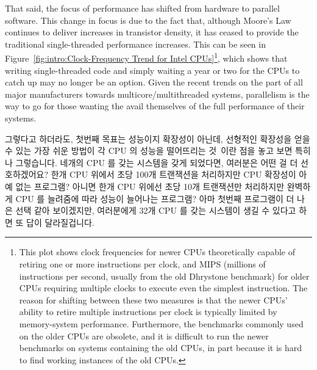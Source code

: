That said, the focus of performance has shifted from hardware to
parallel software.
This change in focus is due to the fact that, although Moore's Law
continues to deliver increases in transistor density, it has ceased to
provide the traditional single-threaded performance increases.
This can be seen in
Figure~\ref{fig:intro:Clock-Frequency Trend for Intel CPUs}\footnote{
	This plot shows clock frequencies for newer CPUs theoretically
	capable of retiring one or more instructions per clock, and MIPS
	(millions of instructions per second, usually from the old
	Dhrystone benchmark)
	for older CPUs requiring multiple clocks to execute even the
	simplest instruction.
	The reason for shifting between these two measures is that the
	newer CPUs' ability to retire multiple instructions per clock is
	typically limited by memory-system performance.
	Furthermore, the benchmarks commonly used on the older CPUs
	are obsolete, and it is difficult to run the newer benchmarks
	on systems containing the old CPUs, in part because it is hard
	to find working instances of the old CPUs.},
which shows that writing single-threaded code and simply waiting
a year or two for the CPUs to catch up may no longer be an option.
Given the recent trends on the part of all major manufacturers towards
multicore/multithreaded systems, parallelism is the way to go for
those wanting the avail themselves of the full performance of their
systems.
\fi

그렇다고 하더라도, 첫번째 목표는 성능이지 확장성이 아닌데, 선형적인 확장성을
얻을 수 있는 가장 쉬운 방법이 각 CPU 의 성능을 떨어뜨리는
것~\cite{LinusTorvalds2001a}이란 점을 놓고 보면 특히나 그렇습니다.
네개의 CPU 를 갖는 시스템을 갖게 되었다면, 여러분은 어떤 걸 더 선호하겠어요?
한개 CPU 위에서 초당 100개 트랜잭션을 처리하지만 CPU 확장성이 아예 없는
프로그램?
아니면 한개 CPU 위에선 초당 10개 트랜잭션만 처리하지만 완벽하게 CPU 를 늘려줌에
따라 성능이 늘어나는 프로그램?
아마 첫번째 프로그램이 더 나은 선택 같아 보이겠지만, 여러분에게 32개 CPU 를
갖는 시스템이 생길 수 있다고 하면 또 답이 달라질겁니다.

